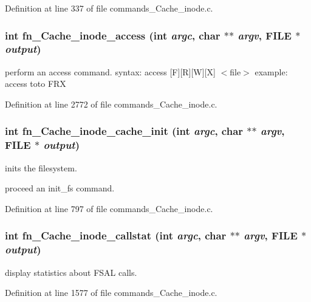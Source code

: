 Definition at line 337 of file commands\_\-Cache\_\-inode.c.
\subsubsection[{fn\_\-Cache\_\-inode\_\-access}]{\setlength{\rightskip}{0pt plus 5cm}int fn\_\-Cache\_\-inode\_\-access (int {\em argc}, \/  char $\ast$$\ast$ {\em argv}, \/  FILE $\ast$ {\em output})}\label{commands_8h_3a0103c605c6c3c40d72196061b5ed4f}


perform an access command. syntax: access [F][R][W][X] $<$file$>$ example: access toto FRX 

Definition at line 2772 of file commands\_\-Cache\_\-inode.c.
\subsubsection[{fn\_\-Cache\_\-inode\_\-cache\_\-init}]{\setlength{\rightskip}{0pt plus 5cm}int fn\_\-Cache\_\-inode\_\-cache\_\-init (int {\em argc}, \/  char $\ast$$\ast$ {\em argv}, \/  FILE $\ast$ {\em output})}\label{commands_8h_58292719ee6d7fd24c9a9964135f45e1}


inits the filesystem.

proceed an init\_\-fs command. 

Definition at line 797 of file commands\_\-Cache\_\-inode.c.
\subsubsection[{fn\_\-Cache\_\-inode\_\-callstat}]{\setlength{\rightskip}{0pt plus 5cm}int fn\_\-Cache\_\-inode\_\-callstat (int {\em argc}, \/  char $\ast$$\ast$ {\em argv}, \/  FILE $\ast$ {\em output})}\label{commands_8h_711e4a11e5bf3bb7fd4be1cdb5f33010}


display statistics about FSAL calls. 

Definition at line 1577 of file commands\_\-Cache\_\-inode.c.
